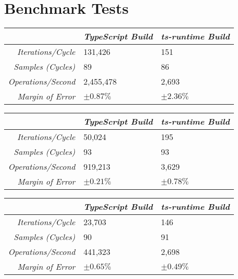 \section{Benchmark Tests}
\label{app:sec:benchmark-results}

\begin{minipage}{\textwidth}
\begin{center}
{
\centering
\tabulinesep=1.2mm
\setlength{\tabcolsep}{5mm}
\def\arraystretch{1.25}
\small
\begin{tabu} to \textwidth {|r||X[c,m]|X[c,m]|}
  \hline
  & \emph{TypeScript Build} & \emph{ts-runtime Build} \\
  \hline
  \hline
  \emph{Iterations/Cycle}  & 131,426 & 151 \\
  \hline
  \emph{Samples (Cycles)}  & 89 & 86 \\
  \hline
  \emph{Operations/Second} & 2,455,478 & 2,693 \\
  \hline
  \emph{Margin of Error}   & $\pm 0.87\%$ & $\pm 2.36\%$ \\
  \hline
\end{tabu}
}
\end{center}

\begin{center}
{
\centering
\tabulinesep=1.2mm
\setlength{\tabcolsep}{5mm}
\def\arraystretch{1.25}
\small
\begin{tabu} to \textwidth {|r||X[c,m]|X[c,m]|}
  \hline
  & \emph{TypeScript Build} & \emph{ts-runtime Build} \\
  \hline
  \hline
  \emph{Iterations/Cycle}  & 50,024 & 195 \\
  \hline
  \emph{Samples (Cycles)}  & 93 & 93 \\
  \hline
  \emph{Operations/Second} & 919,213 & 3,629 \\
  \hline
  \emph{Margin of Error}   & $\pm 0.21\%$ & $\pm 0.78\%$ \\
  \hline
\end{tabu}
}
\end{center}

\begin{center}
{
\centering
\tabulinesep=1.2mm
\setlength{\tabcolsep}{5mm}
\def\arraystretch{1.25}
\small
\begin{tabu} to \textwidth {|r||X[c,m]|X[c,m]|}
  \hline
  & \emph{TypeScript Build} & \emph{ts-runtime Build} \\
  \hline
  \hline
  \emph{Iterations/Cycle}  & 23,703 & 146 \\
  \hline
  \emph{Samples (Cycles)}  & 90 & 91 \\
  \hline
  \emph{Operations/Second} & 441,323 & 2,698 \\
  \hline
  \emph{Margin of Error}   & $\pm 0.65\%$ & $\pm 0.49\%$ \\
  \hline
\end{tabu}
}
\end{center}


\end{minipage}
